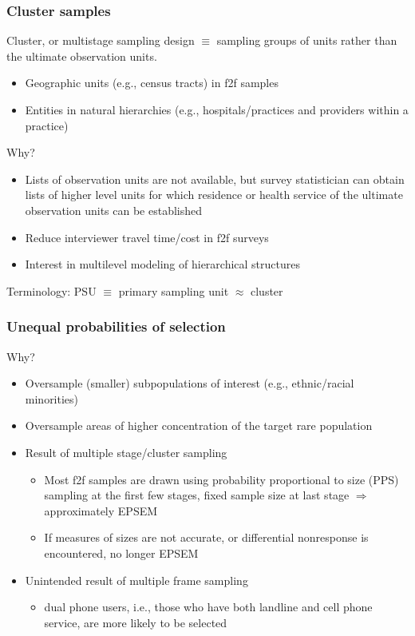 \documentclass{beamer}
\begin{document}
\begin{frame}\frametitle{Cluster samples}

Cluster, or multistage sampling design $\equiv$ sampling groups of units rather than the ultimate observation units.
\begin{itemize}
    \item Geographic units (e.g., census tracts) in f2f samples
    \item Entities in natural hierarchies (e.g., hospitals/practices and providers within a practice)
\end{itemize}

Why?

\begin{itemize}
    \item Lists of observation units are not available, but survey statistician
        can obtain lists of higher level units
        for which residence or health service of the ultimate observation units
        can be established
    \item Reduce interviewer travel time/cost in f2f surveys
    \item Interest in multilevel modeling of hierarchical structures
\end{itemize}

Terminology: PSU $\equiv$ primary sampling unit $\approx$ cluster

\end{frame}

\begin{frame}\frametitle{Unequal probabilities of selection}

Why?

\begin{itemize}
    \item Oversample (smaller) subpopulations of interest (e.g., ethnic/racial minorities)
    \item Oversample areas of higher concentration of the target rare population
    \item Result of multiple stage/cluster sampling
    \begin{itemize}
        \item Most f2f samples are drawn using probability proportional to size (PPS) 
            sampling at the first few stages,
            fixed sample size at last stage $\Rightarrow$ approximately EPSEM
        \item If measures of sizes are not accurate, or differential nonresponse is 
            encountered, no longer EPSEM
    \end{itemize}
    \item Unintended result of multiple frame sampling
        \begin{itemize}
            \item dual phone users, i.e., those who have both landline and cell phone service, are more likely to be selected
        \end{itemize}
\end{itemize}

\end{frame}
\end{document}
